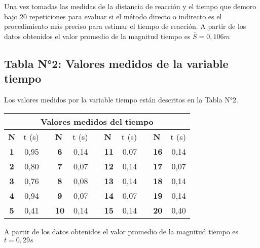 \documentclass[runningheads]{llncs}
\begin{document}
        Una vez tomadas las medidas de la distancia de reacción y el tiempo que demoro bajo 20 repeticiones para evaluar si el método directo o indirecto es el procedimiento más preciso para estimar el tiempo de reacción. 
        A partir de los datos obtenidos el valor promedio de la magnitud tiempo es $\bar{S}=0,106m$
    \subsection*{Tabla N°2: Valores medidos de la variable tiempo}
    Los valores medidos por la variable tiempo están descritos en la Tabla N°2.\\
    \begin{table}[]
        \centering
        \begin{tabular}{crlcrlcrlcr}
            \hline
            \multicolumn{11}{c}{\textbf{Valores medidos del tiempo}} \\ \hline
            \multicolumn{1}{l}{\textbf{N}} & \multicolumn{1}{l}{t (s)} &  & \multicolumn{1}{l}{\textbf{N}} & \multicolumn{1}{l}{t (s)} &  & \multicolumn{1}{l}{\textbf{N}} & \multicolumn{1}{l}{t (s)} &  & \multicolumn{1}{l}{\textbf{N}} & \multicolumn{1}{l}{t (s)} \\ \hline
            \textbf{1} & 0,95 &  & \textbf{6} & 0,14 &  & \textbf{11} & 0,07 &  & \textbf{16} & 0,14 \\
            \textbf{2} & 0,80 &  & \textbf{7} & 0,07 &  & \textbf{12} & 0,14 &  & \textbf{17} & 0,07 \\
            \textbf{3} & 0,76 &  & \textbf{8} & 0,08 &  & \textbf{13} & 0,14 &  & \textbf{18} & 0,14 \\
            \textbf{4} & 0,94 &  & \textbf{9} & 0,07 &  & \textbf{14} & 0,07 &  & \textbf{19} & 0,14 \\
            \textbf{5} & 0,41 &  & \textbf{10} & 0,14 &  & \textbf{15} & 0,14 &  & \textbf{20} & 0,40 \\ \hline
        \end{tabular}
    \end{table}
    A partir de los datos obtenidos el valor promedio de la magnitud tiempo es $\bar{t}=0,29s$
\end{document}
